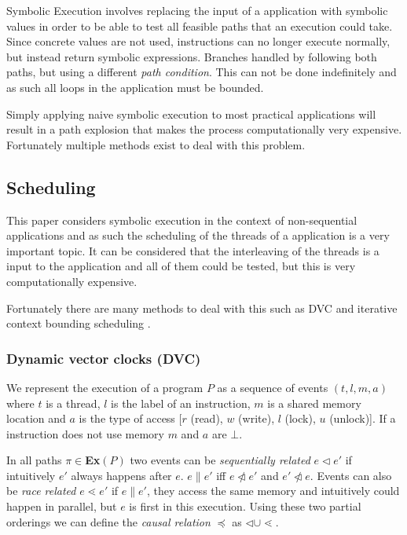 \documentclass[10pt]{llncs}
\begin{document}
Symbolic Execution involves replacing the input of a application with symbolic values in order to be able to test all feasible paths that an execution could take. Since concrete values are not used, instructions can no longer execute normally, but instead return symbolic expressions. Branches handled by following both paths, but using a different \emph{path condition}. This can not be done indefinitely and as such all loops in the application must be bounded.

Simply applying naive symbolic execution to most practical applications will result in a path explosion that makes the process computationally very expensive. Fortunately multiple methods exist to deal with this problem.

\subsection{Scheduling}

This paper considers symbolic execution in the context of non-sequential applications and as such the scheduling of the threads of a application is a very important topic. It can be considered that the interleaving of the threads is a input to the application and all of them could be tested, but this is very computationally expensive.

Fortunately there are many methods to deal with this such as DVC \cite{dvc} and iterative context bounding scheduling \cite{musuvathi2007iterative}.

\subsubsection{Dynamic vector clocks (DVC)}

We represent the execution of a program $P$ as a sequence of events $(t, l, m, a)$ where $t$ is a thread, $l$ is the label of an instruction, $m$ is a shared memory location and $a$ is the type of access [$r$ (read), $w$ (write), $l$ (lock), $u$ (unlock)]. If a instruction does not use memory $m$ and $a$ are $\bot$.

In all paths $\pi \in $\textbf{Ex}$(P)$ two events can be \emph{sequentially related} $e \triangleleft e'$ if intuitively $e'$ always happens after $e$. $e \parallel e'$ iff $e \ntriangleleft e'$ and $e' \ntriangleleft e$. Events can also be \emph{race related} $e \lessdot e'$ if $e \parallel e'$, they access the same memory and intuitively could happen in parallel, but $e$ is first in this execution. Using these two partial orderings we can define the \emph{causal relation} $\preceq$ as $\triangleleft \cup \lessdot$.
\end{document}
